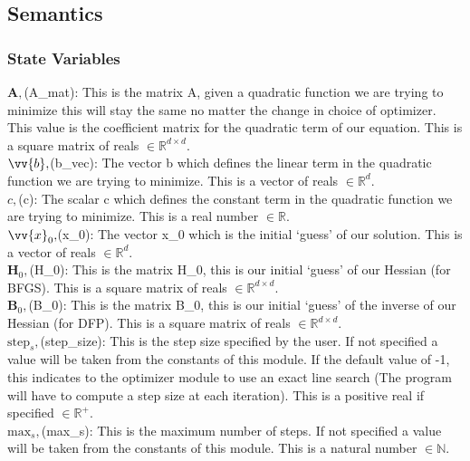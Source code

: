 \documentclass[12pt, titlepage]{article}
\begin{document}
\subsection{Semantics}
\subsubsection{State Variables}
$\mathbf{A},$(A\_mat): This is the matrix A, given a quadratic function we are trying to minimize this will stay the same no matter the change in choice of optimizer. This value is the coefficient matrix for the quadratic term of our equation. This is a square matrix of reals $\in \mathbb{R}^{d \times d}$.
\\

\noindent$\vv{b},$(b\_vec): The vector b which defines the linear term in the quadratic function we are trying to minimize. This is a vector of reals $\in \mathbb{R}^d$.
\\

\noindent$c,$(c): The scalar c which defines the constant term in the quadratic function we are trying to minimize. This is a real number $\in \mathbb{R}$.
\\

\noindent $\vv{x}_0,$(x\_0): The vector x\_0 which is the initial `guess' of our solution. This is a vector of reals $\in \mathbb{R}^d$.
\\

\noindent $\mathbf{H}_0,$(H\_0): This is the matrix H\_0, this is our initial `guess' of our Hessian (for BFGS). This is a square matrix of reals $\in \mathbb{R}^{d \times d}$.
\\

\noindent $\mathbf{B}_0,$(B\_0): This is the matrix B\_0, this is our initial `guess' of the inverse of our Hessian (for DFP). This is a square matrix of reals $\in \mathbb{R}^{d \times d}$.
\\

\noindent $\text{step}_s,$(step\_size): This is the step size specified by the user. If not specified a value will be taken from the constants of this module. If the default value of -1, this indicates to the optimizer module to use an exact line search (The program will have to compute a step size at each iteration). This is a positive real if specified $\in \mathbb{R}^{+}$.
\\

\noindent $\text{max}_s,$(max\_s): This is the maximum number of steps. If not specified a value will be taken from the constants of this module. This is a natural number $\in \mathbb{N}$.
\\
\end{document}
